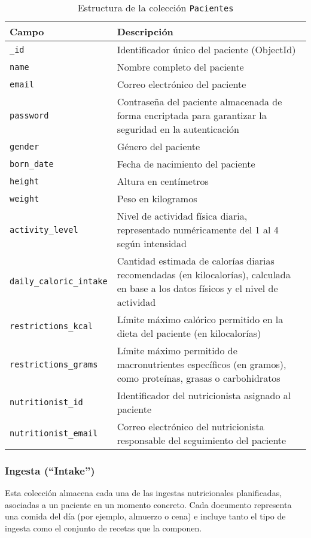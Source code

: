 \begin{table}[H]
    \centering
    \begin{tabular}{|l|p{8cm}|}
        \hline
        \textbf{Campo} & \textbf{Descripción} \\
        \hline
        \texttt{\_id} & Identificador único del paciente (ObjectId) \\
        \hline
        \texttt{name} & Nombre completo del paciente \\
        \hline
        \texttt{email} & Correo electrónico del paciente \\
        \hline
        \texttt{password} & Contraseña del paciente almacenada de forma encriptada para garantizar la seguridad en la autenticación \\
        \hline
        \texttt{gender} & Género del paciente \\
        \hline
        \texttt{born\_date} & Fecha de nacimiento del paciente \\
        \hline
        \texttt{height} & Altura en centímetros \\
        \hline
        \texttt{weight} & Peso en kilogramos \\
        \hline
        \texttt{activity\_level} & Nivel de actividad física diaria, representado numéricamente del 1 al 4 según intensidad \\
        \hline
        \texttt{daily\_caloric\_intake} & Cantidad estimada de calorías diarias recomendadas (en kilocalorías), calculada en base a los datos físicos y el nivel de actividad \\
        \hline
        \texttt{restrictions\_kcal} & Límite máximo calórico permitido en la dieta del paciente (en kilocalorías) \\
        \hline
        \texttt{restrictions\_grams} & Límite máximo permitido de macronutrientes específicos (en gramos), como proteínas, grasas o carbohidratos \\
        \hline
        \texttt{nutritionist\_id} & Identificador del nutricionista asignado al paciente \\
        \hline
        \texttt{nutritionist\_email} & Correo electrónico del nutricionista responsable del seguimiento del paciente \\
        \hline
    \end{tabular}
    \caption{Estructura de la colección \texttt{Pacientes}}
    \label{tab:pacientes}
\end{table}

\subsubsection{Ingesta (``Intake'')}
Esta colección almacena cada una de las ingestas nutricionales planificadas, asociadas a un paciente en un momento concreto. Cada documento representa una comida del día (por ejemplo, almuerzo o cena) e incluye tanto el tipo de ingesta como el conjunto de recetas que la componen.

